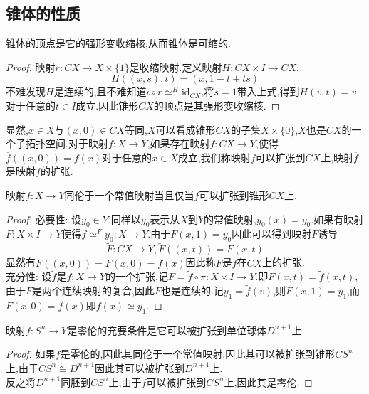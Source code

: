 \documentclass{article}
\begin{document}
\subsection{锥体的性质}
\begin{property}
    锥体的顶点是它的强形变收缩核,从而锥体是可缩的.
\end{property}
\begin{proof}
    映射$r : CX \to X \times \{1\}$是收缩映射.定义映射$H : CX \times I \to CX$,
    $$
    H((x,s),t) = (x,1-t+ts)
    $$
    不难发现$H$是连续的,且不难知道$\iota \circ r \simeq^H \text{id}_{CX}$,将$s = 1$带入上式,得到$H(v,t) = v$对于任意的$t \in I$成立.因此锥形$CX$的顶点是其强形变收缩核.
\end{proof}
显然,$x \in X$与$(x,0) \in CX$等同,$X$可以看成锥形$CX$的子集$X \times \{0\}$,$X$也是$CX$的一个子拓扑空间.对于映射$f : X \to Y$,如果存在映射$\overline{f} : CX \to Y$,使得$\overline{f}((x,0)) = f(x)$对于任意的$x \in X$成立,我们称映射$f$可以扩张到$CX$上,映射$\overline{f}$是映射$f$的扩张.
\begin{property}
    映射$f : X \to Y$同伦于一个常值映射当且仅当$f$可以扩张到锥形$CX$上.
\end{property}
\begin{proof}
    必要性: 设$y_0 \in Y$,同样以$y_0$表示从$X$到$Y$的常值映射,$y_0(x) = y_0$.如果有映射$F : X \times I \to Y$使得$f \simeq^F y_0 : X\to Y$.由于$F(x,1) = y_0$因此可以得到映射$F$诱导
    $$
    \tilde{F} : CX \to Y , \tilde{F}((x,t)) = F(x,t)
    $$
    显然有$\tilde{F}((x,0)) = F(x,0) = f(x)$因此称$\tilde{F}$是$f$在$CX$上的扩张.\\
    充分性: 设$\tilde{f}$是$f : X \to Y$的一个扩张,记$F  = \tilde{f} \circ \pi : X \times I \to Y$.即$F(x,t) = \tilde{f} (x,t)$,由于$F$是两个连续映射的复合,因此$F$也是连续的.记$y_1 = \tilde{f}(v)$,则$F(x,1) = y_1$,而$F(x,0) = f(x)$即$f(x) \simeq y_1$.
\end{proof}
\begin{corollary}
    映射$f:S^n \to Y$是零伦的充要条件是它可以被扩张到单位球体$D^{n+1}$上.
\end{corollary}
\begin{proof}
    如果$f$是零伦的,因此其同伦于一个常值映射,因此其可以被扩张到锥形$CS^n$上,由于$CS^n \cong D^{n+1}$因此其可以被扩张到$D^{n+1}$上.\\
    反之将$D^{n+1}$同胚到$CS^n$上,由于$f$可以被扩张到$CS^n$上,因此其是零伦.
\end{proof}
\end{document}
